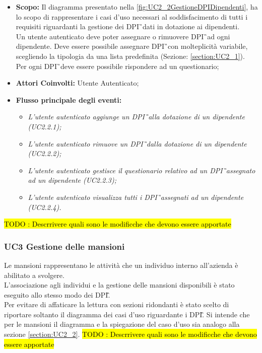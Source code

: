 			\begin{itemize}
				\item \textbf{Scopo:} Il diagramma presentato nella \autoref{fig:UC2_2GestioneDPIDipendenti}, ha lo scopo di rappresentare i casi d'uso necessari al soddisfacimento di tutti i requisiti riguardanti la gestione dei \gls{DPI}\G\ dati in dotazione ai dipendenti. \\ Un utente autenticato deve poter assegnare o rimuovere \gls{DPI}\G\ ad ogni dipendente. Deve essere possibile assegnare \gls{DPI}\G\ con molteplicità variabile, scegliendo la tipologia da una lista predefinita (Sezione: \ref{section:UC2_1}).\\
				Per ogni \gls{DPI}\G\ deve essere possibile rispondere ad un questionario;
				\item \textbf{Attori Coinvolti:} Utente Autenticato;
				\item \textbf{Flusso principale degli eventi:} 
				\begin{itemize}
					\item \textit{L'utente autenticato aggiunge un \gls{DPI}\G\ alla dotazione di un dipendente (UC2.2.1);}
					\item \textit{L'utente autenticato rimuove un \gls{DPI}\G\ dalla dotazione di un dipendente  (UC2.2.2);}
					\item \textit{L'utente autenticato gestisce il questionario relativo ad un \gls{DPI}\G\ assegnato ad un dipendente (UC2.2.3);}
					\item \textit{L'utente autenticato visualizza tutti i \gls{DPI}\G\ assegnati ad un dipendente (UC2.2.4).}
				\end{itemize}
			\end{itemize}
				\hl{TODO : Descrrivere quali sono le modificche che devono essere apportate}
	\newpage		
	\subsubsection{UC3 Gestione  delle mansioni}
		\label{section:UC3}
		Le mansioni rappresentano le attività che un individuo interno all'azienda è abilitato a svolgere.\\
		L'associazione agli individui e la gestione delle mansioni disponibili è stato eseguito allo stesso modo dei \gls{DPI}\G. \\
		Per evitare di affaticare la lettura con sezioni ridondanti è stato scelto di riportare soltanto il diagramma dei casi d'uso riguardante i \gls{DPI}\G. Si intende che per le mansioni il diagramma e la spiegazione del caso d'uso sia analogo alla sezione \ref{section:UC2_2}.
		\hl{TODO : Descrrivere quali sono le modificche che devono essere apportate}
	\newpage 
